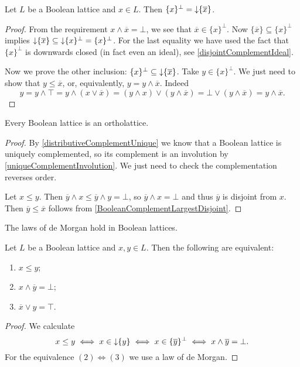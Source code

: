 \begin{lemma} \label{BooleanComplementLargestDisjoint}
Let $L$ be a Boolean lattice and $x\in L$. Then $\{x\}^\perp = \operatorname{\downarrow} \{\overline{x}\}$.
\end{lemma}
\begin{proof}
From the requirement $x\wedge \overline{x} = \bot$, we see that $\overline{x}\in \{x\}^\perp$. Now $\{\overline{x}\} \subseteq \{x\}^\perp$ implies $\operatorname{\downarrow} \{\overline{x}\} \subseteq \operatorname{\downarrow}\{x\}^\perp = \{x\}^\perp$. For the last equality we have used the fact that $\{x\}^\perp$ is downwards closed (in fact even an ideal), see \ref{disjointComplementIdeal}.

Now we prove the other inclusion: $\{x\}^\perp \subseteq \operatorname{\downarrow} \{\overline{x}\}$.
Take $y\in \{x\}^\perp$. We just need to show that $y\leq \overline{x}$, or, equivalently, $y = y\wedge \overline{x}$. Indeed
\[ y = y \wedge \top = y\wedge (x\vee \overline{x}) = (y\wedge x)\vee (y\wedge \overline{x}) = \bot \vee (y\wedge \overline{x}) = y\wedge \overline{x}. \]
\end{proof}
\begin{corollary}
Every Boolean lattice is an ortholattice.
\end{corollary}
\begin{proof}
By \ref{distributiveComplementUnique} we know that a Boolean lattice is uniquely complemented, so its complement is an involution by \ref{uniqueComplementInvolution}. We just need to check the complementation reverses order.

Let $x\leq y$. Then $\overline{y} \wedge x \leq \overline{y} \wedge y = \bot$, so $\overline{y} \wedge x = \bot$ and thus $\overline{y}$ is disjoint from $x$. Then $\overline{y} \leq \overline{x}$ follows from \ref{BooleanComplementLargestDisjoint}.
\end{proof}
\begin{corollary}
The laws of de Morgan hold in Boolean lattices.
\end{corollary}
\begin{corollary} \label{BooleanInequalities}
Let $L$ be a Boolean lattice and $x,y\in L$. Then the following are equivalent:
\begin{enumerate}
\item $x \leq y$;
\item $x\wedge \overline{y} = \bot$;
\item $\overline{x} \vee y = \top$.
\end{enumerate}
\end{corollary}
\begin{proof}
We calculate
\[ x \leq y \iff x\in\operatorname{\downarrow}\{y\} \iff x\in\{\overline{y}\}^\perp \iff x\wedge \overline{y} = \bot. \]
For the equivalence $(2) \Leftrightarrow (3)$ we use a law of de Morgan.
\end{proof}

